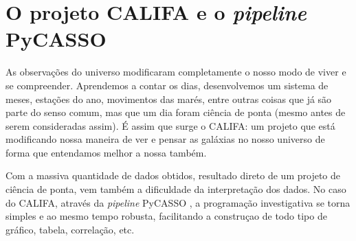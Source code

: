 


\chapter{O projeto CALIFA e o {\em pipeline} PyCASSO}
\label{sec:CALePyC}

As observações do universo modificaram completamente o nosso modo de viver e se
compreender. Aprendemos a contar os dias, desenvolvemos um sistema de meses,
estações do ano, movimentos das marés, entre outras coisas que já são parte do
senso comum, mas que um dia foram ciência de ponta (mesmo antes de serem
consideradas assim). É assim que surge o CALIFA: um projeto que está
modificando nossa maneira de ver e pensar as galáxias no nosso universo de
forma que entendamos melhor a nossa também.

Com a massiva quantidade de dados obtidos, resultado direto de um projeto de
ciência de ponta, vem também a dificuldade da interpretação dos dados. No caso
do CALIFA, através da {\em pipeline} PyCASSO \citep{CidFernandes2013a}, a
programação investigativa se torna simples e ao mesmo tempo robusta,
facilitando a construçao de todo tipo de gráfico, tabela, correlação, etc.


